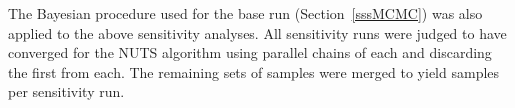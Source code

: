 \documentclass[11pt]{book}
\begin{document}

The Bayesian procedure used for the base run (Section~\ref{sssMCMC}) was also applied to the above  sensitivity analyses.
All sensitivity runs were judged to have converged for the NUTS algorithm using \nChains{} parallel chains of \cSims{} each and discarding the first \cBurn{} from each. 
The remaining \nChains{} sets of \cSamps{} samples were merged to yield \Nmcmc{} samples per sensitivity run.
\end{document}
